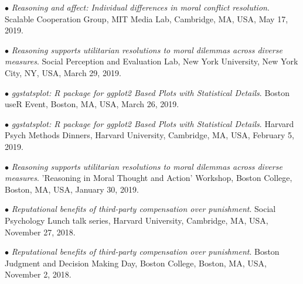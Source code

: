 \documentclass[10pt]{article}
\begin{document}
	$\bullet$ \textit{Reasoning and affect: Individual differences in moral conflict resolution}. Scalable Cooperation Group, MIT \hspace*{0.1in}Media Lab, Cambridge, MA, USA, May 17, 2019.\\
	\miniskip

	$\bullet$ \textit{Reasoning supports utilitarian resolutions to moral dilemmas across diverse measures}. Social Perception and \hspace*{0.1in}Evaluation Lab, New York University, New York City, NY, USA, March 29, 2019.\\
	\miniskip

	$\bullet$ \textit{ggstatsplot: R package for ggplot2 Based Plots with Statistical Details}. Boston useR Event, Boston, MA, \hspace*{0.1in}USA, March 26, 2019.\\
	\miniskip

	$\bullet$ \textit{ggstatsplot: R package for ggplot2 Based Plots with Statistical Details}. Harvard Psych Methods Dinners, \hspace*{0.1in}Harvard University, Cambridge, MA, USA, February 5, 2019.\\
	\miniskip

	$\bullet$ \textit{Reasoning supports utilitarian resolutions to moral dilemmas across diverse measures}. 'Reasoning in Moral \hspace*{0.1in}Thought and Action' Workshop, Boston College, Boston, MA, USA, January 30, 2019.\\
	\miniskip	
	
	$\bullet$ \textit{Reputational benefits of third-party compensation over punishment}. Social Psychology Lunch talk series, \hspace*{0.1in}Harvard University, Cambridge, MA, USA, November 27, 2018.\\
	\miniskip	


	$\bullet$ \textit{Reputational benefits of third-party compensation over punishment}. Boston Judgment and Decision Making \hspace*{0.1in}Day, Boston College, Boston, MA, USA, November 2, 2018.\\
	\miniskip	
\end{document}
